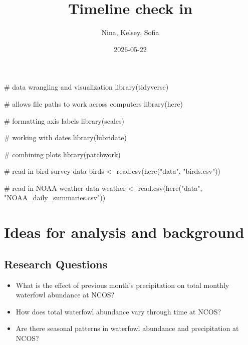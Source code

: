 \documentclass[
  letterpaper,
  DIV=11,
  numbers=noendperiod]{scrartcl}
\title{Timeline check in}
\author{Nina, Kelsey, Sofia}
\date{2026-05-22}
\newenvironment{Shaded}{\begin{snugshade}}{\end{snugshade}}
\newcommand{\CommentTok}[1]{\textcolor[rgb]{0.37,0.37,0.37}{#1}}
\newcommand{\FunctionTok}[1]{\textcolor[rgb]{0.28,0.35,0.67}{#1}}
\newcommand{\NormalTok}[1]{\textcolor[rgb]{0.00,0.23,0.31}{#1}}
\newcommand{\OtherTok}[1]{\textcolor[rgb]{0.00,0.23,0.31}{#1}}
\newcommand{\StringTok}[1]{\textcolor[rgb]{0.13,0.47,0.30}{#1}}
\providecommand{\tightlist}{%
  \setlength{\itemsep}{0pt}\setlength{\parskip}{0pt}}\usepackage{longtable,booktabs,array}
\begin{document}
\maketitle


\begin{Shaded}
\begin{Highlighting}[]
\CommentTok{\# data wrangling and visualization}
\FunctionTok{library}\NormalTok{(tidyverse)}

\CommentTok{\# allows file paths to work across computers}
\FunctionTok{library}\NormalTok{(here)}

\CommentTok{\# formatting axis labels}
\FunctionTok{library}\NormalTok{(scales)}

\CommentTok{\# working with dates}
\FunctionTok{library}\NormalTok{(lubridate)}

\CommentTok{\# combining plots}
\FunctionTok{library}\NormalTok{(patchwork)}
\end{Highlighting}
\end{Shaded}

\begin{Shaded}
\begin{Highlighting}[]
\CommentTok{\# read in bird survey data}
\NormalTok{birds }\OtherTok{\textless{}{-}} \FunctionTok{read.csv}\NormalTok{(}\FunctionTok{here}\NormalTok{(}\StringTok{"data"}\NormalTok{, }\StringTok{"birds.csv"}\NormalTok{))}

\CommentTok{\# read in NOAA weather data}
\NormalTok{weather }\OtherTok{\textless{}{-}} \FunctionTok{read.csv}\NormalTok{(}\FunctionTok{here}\NormalTok{(}\StringTok{"data"}\NormalTok{, }\StringTok{"NOAA\_daily\_summaries.csv"}\NormalTok{))}
\end{Highlighting}
\end{Shaded}

\section{Ideas for analysis and
background}\label{ideas-for-analysis-and-background}

\subsection{Research Questions}\label{research-questions}

\begin{itemize}
\tightlist
\item
  What is the effect of previous month's precipitation on total monthly
  waterfowl abundance at NCOS?
\item
  How does total waterfowl abundance vary through time at NCOS?
\item
  Are there seasonal patterns in waterfowl abundance and precipitation
  at NCOS?
\end{itemize}
\end{document}
